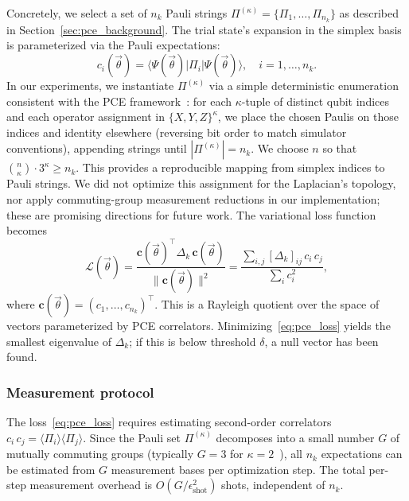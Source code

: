 \documentclass[conference,10pt]{IEEEtran}
\begin{document}
Concretely, we select a set of $n_k$ Pauli strings $\Pi^{(\kappa)} =
\{\Pi_1, \ldots, \Pi_{n_k}\}$ as described in
Section~\ref{sec:pce_background}. The trial state's expansion in the
simplex basis is parameterized via the Pauli expectations:
\begin{equation}
    c_i(\vec{\theta}) =
    \langle \Psi(\vec{\theta}) | \Pi_i | \Psi(\vec{\theta}) \rangle,
    \quad i = 1, \ldots, n_k.
    \label{eq:pce_coefficients}
\end{equation}
In our experiments, we instantiate $\Pi^{(\kappa)}$ via a simple
deterministic enumeration consistent with the PCE
framework~\cite{Sciorilli24, IBMpce}: for each $\kappa$-tuple of
distinct qubit indices and each operator assignment in
$\{X,Y,Z\}^\kappa$, we place the chosen Paulis on those indices and
identity elsewhere (reversing bit order to match simulator
conventions), appending strings until $|\Pi^{(\kappa)}| = n_k$. We
choose $n$ so that $\binom{n}{\kappa}\cdot 3^\kappa \ge n_k$. This
provides a reproducible mapping from simplex indices to Pauli strings.
We did not optimize this assignment for the Laplacian's topology, nor
apply commuting-group measurement reductions in our implementation;
these are promising directions for future work. The variational loss
function becomes
\begin{equation}
    \mathcal{L}(\vec{\theta})
    = \frac{\mathbf{c}(\vec{\theta})^\top \Delta_k\,
            \mathbf{c}(\vec{\theta})}
           {\|\mathbf{c}(\vec{\theta})\|^2}
    = \frac{\sum_{i,j} [\Delta_k]_{ij}\, c_i\, c_j}
           {\sum_i c_i^2},
    \label{eq:pce_loss}
\end{equation}
where $\mathbf{c}(\vec{\theta}) = (c_1, \ldots, c_{n_k})^\top$. This
is a Rayleigh quotient over the space of vectors parameterized by PCE
correlators. Minimizing~\eqref{eq:pce_loss} yields the smallest
eigenvalue of $\Delta_k$; if this is below threshold $\delta$, a null
vector has been found.

\subsubsection{Measurement protocol}

The loss~\eqref{eq:pce_loss} requires estimating second-order
correlators $c_i\, c_j = \langle \Pi_i \rangle \langle \Pi_j \rangle$.
Since the Pauli set $\Pi^{(\kappa)}$ decomposes into a small number
$G$ of mutually commuting groups (typically $G = 3$ for $\kappa =
2$~\cite{Sciorilli24}), all $n_k$ expectations can be estimated from
$G$ measurement bases per optimization step. The total per-step
measurement overhead is $O(G / \epsilon_{\mathrm{shot}}^2)$ shots,
independent of $n_k$.
\end{document}
